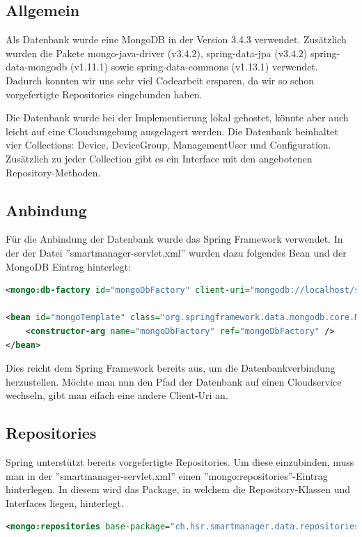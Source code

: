 \subsection{Allgemein}
Als Datenbank wurde eine MongoDB in der Version 3.4.3 verwendet. Zusätzlich wurden die Pakete mongo-java-driver (v3.4.2), spring-data-jpa (v3.4.2) spring-data-mongodb (v1.11.1) sowie spring-data-commons (v1.13.1) verwendet. Dadurch konnten wir uns sehr viel Codearbeit ersparen, da wir so schon vorgefertigte Repositories eingebunden haben.

Die Datenbank wurde bei der Implementierung lokal gehostet, könnte aber auch leicht auf eine Cloudumgebung ausgelagert werden. Die Datenbank beinhaltet vier Collections: Device, DeviceGroup, ManagementUser und Configuration. Zusätzlich zu jeder Collection gibt es ein Interface mit den angebotenen Repository-Methoden.
\subsection{Anbindung}
Für die Anbindung der Datenbank wurde das Spring Framework verwendet. In der der Datei ''smartmanager-servlet.xml'' wurden dazu folgendes Bean und der MongoDB Eintrag hinterlegt:
\begin{lstlisting}[language=xml]
<mongo:db-factory id="mongoDbFactory" client-uri="mongodb://localhost/smartmanager" />

<bean id="mongoTemplate" class="org.springframework.data.mongodb.core.MongoTemplate">
	<constructor-arg name="mongoDbFactory" ref="mongoDbFactory" />
</bean>
\end{lstlisting}
Dies reicht dem Spring Framework bereits aus, um die Datenbankverbindung herzustellen. Möchte man nun den Pfad der Datenbank auf einen Cloudservice wechseln, gibt man eifach eine andere Client-Uri an.

\subsection{Repositories}
Spring unterstützt bereits vorgefertigte Repositories. Um diese einzubinden, muss man in der ''smartmanager-servlet.xml'' einen ''mongo:repositories''-Eintrag hinterlegen. In diesem wird das Package, in welchem die Repository-Klassen und Interfaces liegen, hinterlegt.
\begin{lstlisting}[language=xml]
<mongo:repositories base-package="ch.hsr.smartmanager.data.repositories" />
\end{lstlisting}

